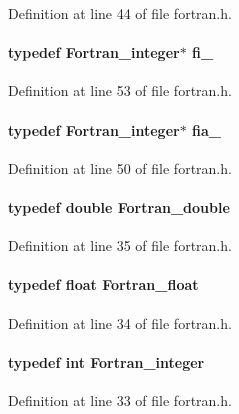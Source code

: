 Definition at line 44 of file fortran.h.

\paragraph[{fi\_\-}]{\setlength{\rightskip}{0pt plus 5cm}typedef {\bf Fortran\_\-integer}$\ast$ {\bf fi\_\-}}\hfill\label{fortran_8h_a5fb0f459886dcbd01f485acca3066001}


Definition at line 53 of file fortran.h.

\paragraph[{fia\_\-}]{\setlength{\rightskip}{0pt plus 5cm}typedef {\bf Fortran\_\-integer}$\ast$ {\bf fia\_\-}}\hfill\label{fortran_8h_a785e5772faf258eb171df131439a7597}


Definition at line 50 of file fortran.h.

\paragraph[{Fortran\_\-double}]{\setlength{\rightskip}{0pt plus 5cm}typedef double {\bf Fortran\_\-double}}\hfill\label{fortran_8h_a4d76581d14d29838a4afe6fa1bf606bd}


Definition at line 35 of file fortran.h.

\paragraph[{Fortran\_\-float}]{\setlength{\rightskip}{0pt plus 5cm}typedef float {\bf Fortran\_\-float}}\hfill\label{fortran_8h_a46fd6cfac5ea84b62063d1a39291c40f}


Definition at line 34 of file fortran.h.

\paragraph[{Fortran\_\-integer}]{\setlength{\rightskip}{0pt plus 5cm}typedef int {\bf Fortran\_\-integer}}\hfill\label{fortran_8h_a15b7ce181271097cf077da8f76060542}


Definition at line 33 of file fortran.h.

